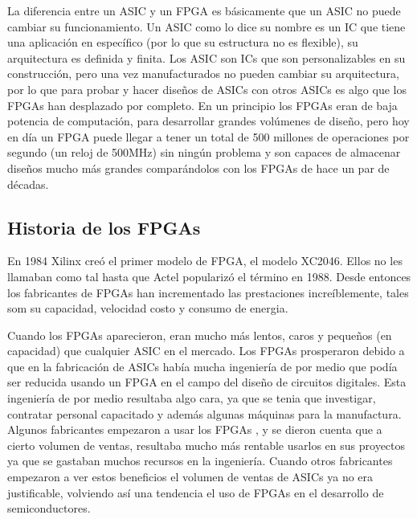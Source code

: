 \documentclass[twoside,spanish,ESP,MSc]{plantillaLabUPV}
\theoremstyle{definition}
\newcommand{\f}{FPGA }
\newcommand{\fs}{FPGAs }
\begin{document}
La diferencia entre un ASIC y un \f es básicamente que un ASIC no puede cambiar su funcionamiento. Un ASIC como lo dice su nombre es un IC que tiene una aplicación en específico (por lo que su estructura no es flexible), su arquitectura es definida y finita. Los ASIC son ICs que son personalizables en su construcción, pero una vez manufacturados no pueden cambiar su arquitectura, por lo que para probar y hacer diseños de ASICs con otros ASICs es algo que los \fs han desplazado por completo. En un principio los \fs eran de baja potencia de computación, para desarrollar grandes volúmenes de diseño, pero hoy en día un \f puede llegar a tener un total de 500 millones de operaciones por segundo (un reloj de 500MHz) sin ningún problema y son capaces de almacenar diseños mucho más grandes comparándolos con los \fs de hace un par de décadas.

\subsection{Historia de los FPGAs}
En 1984 Xilinx creó el primer modelo de FPGA, el modelo XC2046. Ellos no les llamaban como tal hasta que Actel popularizó el término en 1988. Desde entonces los fabricantes de \fs han incrementado las prestaciones increíblemente, tales som su capacidad, velocidad costo y consumo de energia.





Cuando los \fs aparecieron, eran mucho más lentos, caros y pequeños (en capacidad) que cualquier ASIC en el mercado. Los \fs prosperaron debido a que en la fabricación de ASICs había mucha ingeniería de por medio que podía ser reducida usando un FPGA en el campo del diseño de circuitos digitales. Esta ingeniería de por medio resultaba algo cara, ya que se tenia que investigar, contratar personal capacitado y además algunas máquinas para la manufactura. Algunos fabricantes empezaron a usar los \fs, y se dieron cuenta que a cierto volumen de ventas, resultaba mucho más rentable usarlos en sus proyectos ya que se gastaban muchos recursos en la ingeniería. Cuando otros fabricantes empezaron a ver estos beneficios el volumen de ventas de ASICs ya no era justificable, volviendo así una tendencia el uso de FPGAs en el desarrollo de semiconductores.\\
\end{document}
